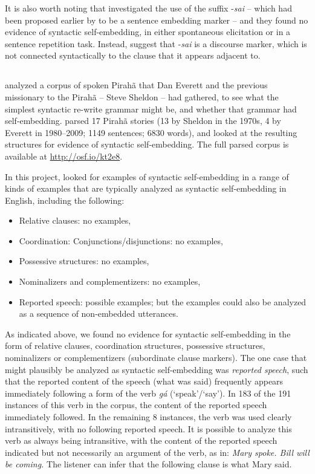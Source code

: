 \documentclass{article}
\begin{document}
It is also worth noting that \citet{sakel2010piraha} investigated the use of the suffix -\textit{sai} -- which had been proposed earlier by \citet{everett1986piraha} to be a sentence embedding marker -- and they found no evidence of syntactic self-embedding, in either spontaneous elicitation or in a sentence repetition task. Instead, \citet{sakel2010piraha} suggest that -\textit{sai} is a discourse marker, which is not connected syntactically to the clause that it appears adjacent to.

\subsection{}

\citet{futrell2016corpus} analyzed a corpus of spoken Pirahã that Dan Everett and the previous missionary to the Pirahã -- Steve Sheldon -- had gathered, to see what the simplest syntactic re-write grammar might be, and whether that grammar had self-embedding. \citet{futrell2016corpus} parsed 17 Pirahã stories (13 by Sheldon in the 1970s, 4 by Everett in 1980--2009; 1149 sentences; 6830 words), and looked at the resulting structures for evidence of syntactic self-embedding. The full parsed corpus is available at \url{http://osf.io/kt2e8}.

In this project, \citet{futrell2016corpus} looked for examples of syntactic self\hyp embedding in a range of kinds of examples that are typically analyzed as syntactic self-embedding in English, including the following:

\begin{itemize}
    \item Relative clauses: no examples,
    \item Coordination: Conjunctions/disjunctions: no examples, 
    \item Possessive structures: no examples,
    \item Nominalizers and complementizers: no examples,
    \item Reported speech: possible examples; but the examples could also be analyzed as a sequence of non-embedded utterances.
\end{itemize} 

As indicated above, we found no evidence for syntactic self-embedding in the form of relative clauses, coordination structures, possessive structures, nominalizers or complementizers (subordinate clause markers). The one case that might plausibly be analyzed as syntactic self-embedding was \textit{reported speech}, such that the reported content of the speech (what was said) frequently appears immediately following a form of the verb \textit{gá} (`speak'/`say'). In 183 of the 191 instances of this verb in the corpus, the content of the reported speech immediately followed. In the remaining 8 instances, the verb was used clearly intransitively, with no following reported speech. It is possible to analyze this verb as always being intransitive, with the content of the reported speech indicated but not necessarily an argument of the verb, as in:  \textit{Mary spoke.  Bill will be coming.}  The listener can infer that the following clause is what Mary said.  
\end{document}
